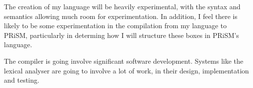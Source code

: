 \documentclass[12pt, a4paper]{article}
\begin{document}
The creation of my language will be heavily experimental, with the syntax and
semantics allowing much room for experimentation. In addition, I feel there is
likely to be some experimentation in the compilation from my language to PRiSM,
particularly in determing how I will structure these boxes in PRiSM's language.

The compiler is going involve significant software development. Systems like the
lexical analyser are going to involve a lot of work, in their design,
implementation and testing.

\end{document}
